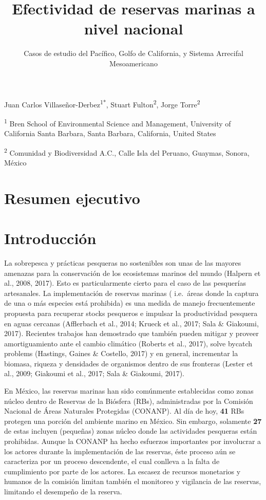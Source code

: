 \documentclass[12pt,]{article}
\title{Efectividad de reservas marinas a nivel nacional}
\subtitle{Casos de estudio del Pacífico, Golfo de California, y Sistema Arrecifal
Mesoamericano}
\author{}
\date{}
\begin{document}
\maketitle

{
\setcounter{tocdepth}{2}
\tableofcontents
}
Juan Carlos Villaseñor-Derbez\textsuperscript{1*}, Stuart
Fulton\textsuperscript{2}, Jorge Torre\textsuperscript{2}

\textsuperscript{1} Bren School of Environmental Science and Management,
University of California Santa Barbara, Santa Barbara, California,
United States

\textsuperscript{2} Comunidad y Biodiversidad A.C., Calle Isla del
Peruano, Guaymas, Sonora, México

\section{Resumen ejecutivo}\label{resumen-ejecutivo}

\section{Introducción}\label{introduccion}

La sobrepesca y prácticas pesqueras no sostenibles son unas de las
mayores amenazas para la conservación de los ecosistemas marinos del
mundo (Halpern et al., 2008, 2017). Esto es particularmente cierto para
el caso de las pesquerías artesanales. La implementación de reservas
marinas ( i.e.~áreas donde la captura de una o más especies está
prohibida) es una medida de manejo frecuentemente propuesta para
recuperar stocks pesqueros e impulsar la productividad pesquera en aguas
cercanas (Afflerbach et al., 2014; Krueck et al., 2017; Sala \&
Giakoumi, 2017). Recientes trabajos han demostrado que también pueden
mitigar y proveer amortiguamiento ante el cambio climático (Roberts et
al., 2017), solve bycatch problems (Hastings, Gaines \& Costello, 2017)
y en general, incrementar la biomasa, riqueza y densidades de organismos
dentro de sus fronteras (Lester et al., 2009; Giakoumi et al., 2017;
Sala \& Giakoumi, 2017).

En México, las reservas marinas han sido comúnmente establecidas como
zonas núcleo dentro de Reservas de la Biósfera (RBs), administradas por
la Comisión Nacional de Áreas Naturales Protegidas (CONANP). Al día de
hoy, \textbf{41} RBs protegen una porción del ambiente marino en México.
Sin embargo, solamente \textbf{27} de estas incluyen (pequeñas) zonas
núcleo donde las actividades pesqueras están prohibidas. Aunque la
CONANP ha hecho esfuerzos importantes por involucrar a los actores
durante la implementación de las reservas, éste proceso aún se
caracteriza por un proceso descendente, el cual conlleva a la falta de
cumplimiento por parte de los actores. La escasez de recursos monetarios
y humanos de la comisión limitan también el monitoreo y vigilancia de
las reservas, limitando el desempeño de la reserva.
\end{document}

